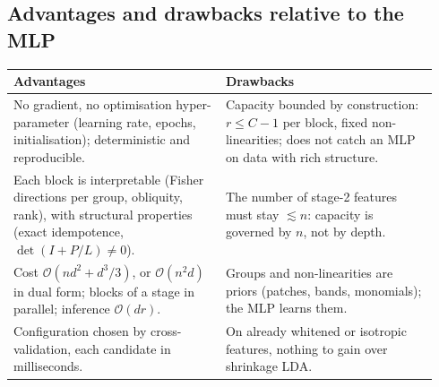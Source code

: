 \documentclass[11pt,a4paper]{article}
\theoremstyle{plain}
\theoremstyle{definition}
\theoremstyle{remark}
\begin{document}
\subsection{Advantages and drawbacks relative to the MLP}
\begin{center}\small\renewcommand{\arraystretch}{1.15}
\begin{tabular}{@{}p{0.47\linewidth}p{0.47\linewidth}@{}}
\toprule
\textbf{Advantages} & \textbf{Drawbacks} \\
\midrule
No gradient, no optimisation hyper-parameter (learning rate, epochs,
initialisation); deterministic and reproducible. &
Capacity bounded by construction: $r\le C-1$ per block, fixed
non-linearities; does not catch an MLP on data with rich structure. \\
Each block is interpretable (Fisher directions per group, obliquity, rank),
with structural properties (exact idempotence, $\det(I+P/L)\ne0$). &
The number of stage-2 features must stay $\lesssim n$: capacity is governed
by $n$, not by depth. \\
Cost $\mathcal O(nd^2+d^3/3)$, or $\mathcal O(n^2d)$ in dual form; blocks of
a stage in parallel; inference $\mathcal O(dr)$. &
Groups and non-linearities are priors (patches, bands, monomials); the MLP
learns them. \\
Configuration chosen by cross-validation, each candidate in milliseconds. &
On already whitened or isotropic features, nothing to gain over shrinkage
LDA. \\
\bottomrule
\end{tabular}
\end{center}

\end{document}
